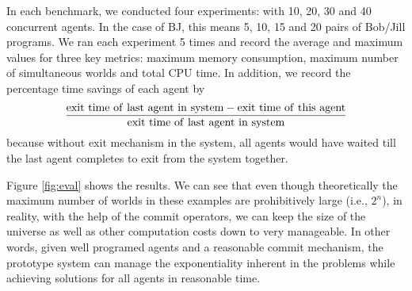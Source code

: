 \begin{figure*}[th]
\centering
%
\caption{Evaluation Results}
\label{fig:eval}
\end{figure*}
In each benchmark, we conducted four experiments: with 10, 20, 30 and 40
concurrent agents. In the case of BJ, this means 5, 10, 15 and 20 pairs of 
Bob/Jill programs. We ran each experiment 5 times and record the average and
maximum values for three key metrics: 
maximum memory consumption, maximum number of simultaneous worlds and 
total CPU time. 
In addition, we record the percentage time savings of each agent by
\begin{equation*}
\frac{\rm{exit\ time\ of\ last\ agent\ in\ system} - 
\rm{exit\ time\ of\ this\ agent}}
{\rm{exit\ time\ of\ last\ agent\ in\ system}}
\end{equation*}
because without exit mechanism in the system, all agents would have waited
till the last agent completes to exit from the system together. 

Figure \ref{fig:eval} shows the results.
We can see that even though theoretically the
maximum number of worlds in these examples are prohibitively large 
(i.e., $2^n$),
in reality, with the help of the commit operators, we can keep
the size of the universe as well as other computation costs
down to very manageable. In other words, given well programed agents and a
reasonable commit mechanism, the prototype system can manage 
the exponentiality inherent in the problems while achieving 
solutions for all agents in reasonable time. 

